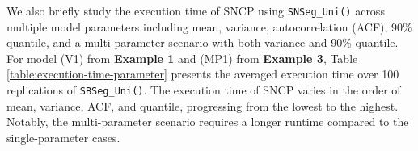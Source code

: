 
{ We also briefly study the execution time of  SNCP using \texttt{SNSeg\_Uni()} across multiple model parameters including mean, variance, autocorrelation (ACF), 90\% quantile, and a multi-parameter scenario with both variance and  90\% quantile.  For model (V1) from \textbf{Example 1} and (MP1) from \textbf{Example 3}, Table \ref{table:execution-time-parameter} presents the averaged execution time over 100 replications of \texttt{SBSeg\_Uni()}. The execution time of SNCP varies in the order of mean, variance, ACF, and quantile, progressing from the lowest to the highest. Notably, the multi-parameter scenario requires a longer runtime compared to the single-parameter cases.}
\begin{table}[!h]
  \begin{center}
  \caption{Execution time (in seconds) of SNCP for different parameters when applied to the models (V1) and (MP1) averaged over 100 replications. }\label{table:execution-time-parameter}
  \end{center}  
\end{table}


